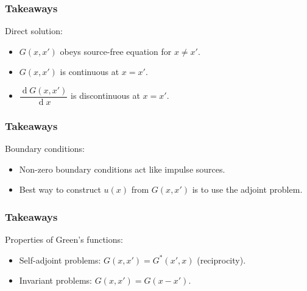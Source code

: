 \documentclass[12 pt, compress, handout, intlimits]{beamer}
\renewcommand{\d}{\operatorname{d}}
\begin{document}
\note{}
\fi

\begin{frame}[fragile]
    \frametitle{Takeaways}
     
    Direct solution:
    \begin{itemize}
    \item
        $ G(x,x') $ obeys source-free equation for $ x \neq x' $.
    \item
        $ G(x,x') $ is continuous at $ x = x' $.
    \item
        $ \dfrac{\d G(x,x')}{\d x} $ is discontinuous at $ x = x' $.
    \end{itemize}
    
\end{frame}

\note{}

\begin{frame}[fragile]
    \frametitle{Takeaways}

    Boundary conditions:
    \begin{itemize}
    \item
        Non-zero boundary conditions act like impulse sources.
    \item
        Best way to construct $ u(x) $ from $ G(x,x') $ is to use the adjoint problem.
    \end{itemize}
    
\end{frame}

\note{}

\begin{frame}[fragile]
    \frametitle{Takeaways}
    
    Properties of Green's functions:
    \begin{itemize}
    \item
        Self-adjoint problems: $ G(x,x') = G^*(x',x) $ (reciprocity).
    \item
        Invariant problems: $ G(x,x') = G(x - x') $.
    \end{itemize}
    
\end{frame}

\note{}
\end{document}
